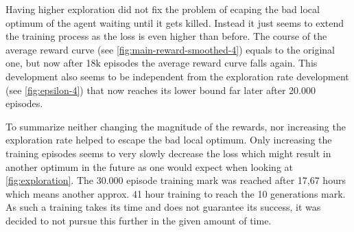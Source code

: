 Having higher exploration did not fix the problem of ecaping the bad local optimum of the agent waiting until it gets killed. Instead it just seems to extend the training process as the loss is even higher than before. The course of the average reward curve (see \autoref{fig:main-reward-smoothed-4}) equals to the original one, but now after 18k episodes the average reward curve falls again. This development also seems to be independent from the exploration rate development (see \autoref{fig:epsilon-4}) that now reaches its lower bound far later after 20.000 episodes. 

To summarize neither changing the magnitude of the rewards, nor increasing the exploration rate helped to escape the bad local optimum. Only increasing the training episodes seems to very slowly decrease the loss which might result in another optimum in the future as one would expect when looking at \autoref{fig:exploration}. The 30.000 episode training mark was reached after 17,67 hours which means another approx. 41 hour training to reach the 10 generations mark. As such a training takes its time and does not guarantee its success, it was decided to not pursue this further in the given amount of time. 

\newpage
